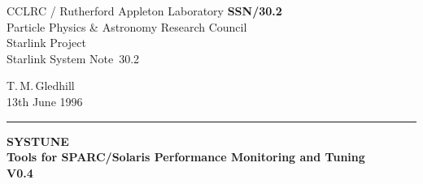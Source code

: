 \documentclass[11pt]{article}
\newcommand{\stardoccategory}  {Starlink System Note}
\newcommand{\stardocinitials}  {SSN}
\newcommand{\stardocnumber}    {30.2}
\newcommand{\stardocauthors}   {T.\,M.\,Gledhill}
\newcommand{\stardocdate}      {13th June 1996}
\newcommand{\stardoctitle}     {SYSTUNE\\[1ex]
 Tools for SPARC/Solaris Performance Monitoring and Tuning\\[1ex]
V0.4}
\newcommand{\stardocname}{\stardocinitials /\stardocnumber}
\newenvironment{latexonly}{}{}
\begin{document}
\thispagestyle{empty}

\begin{latexonly}
   CCLRC / {\sc Rutherford Appleton Laboratory} \hfill {\bf \stardocname}\\
   {\large Particle Physics \& Astronomy Research Council}\\
   {\large Starlink Project\\}
   {\large \stardoccategory\ \stardocnumber}
   \begin{flushright}
   \stardocauthors\\
   \stardocdate
   \end{flushright}
   \vspace{-4mm}
   \rule{\textwidth}{0.5mm}
   \vspace{5mm}
   \begin{center}
   {\Large\bf \stardoctitle}
   \end{center}
   \vspace{5mm}

\end{latexonly}
\end{document}
